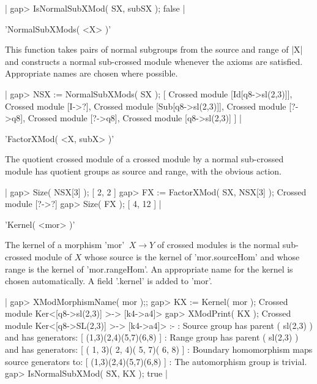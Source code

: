 |    gap> IsNormalSubXMod( SX, subSX );
    false  |

%

'NormalSubXMods( <X> )'

This function takes pairs of normal subgroups from the source and range of |X| 
and constructs a normal sub-crossed module whenever the axioms are satisfied.
Appropriate names are chosen where possible.

|    gap> NSX := NormalSubXMods( SX );
    [ Crossed module [Id[q8->sl(2,3)]], Crossed module [I->?], 
      Crossed module [Sub[q8->sl(2,3)]], Crossed module [?->q8], 
      Crossed module [?->q8], Crossed module [q8->sl(2,3)] ]    |

%

'FactorXMod( <X, subX> )'

The quotient crossed module of a crossed module by a normal sub-crossed
module has quotient groups as source and range, with the obvious action.

|    gap> Size( NSX[3] );
    [ 2, 2 ]
    gap> FX := FactorXMod( SX, NSX[3] );
    Crossed module [?->?]
    gap> Size( FX );
    [ 4, 12 ]  |

%

'Kernel( <mor> )'

The kernel of a morphism  'mor' $\: X \to Y$
of crossed modules is the normal sub-crossed module of $X$
whose source is the kernel of 'mor.sourceHom'
and whose range is the kernel of 'mor.rangeHom'.
An appropriate name for the kernel is chosen automatically.
A field '.kernel' is added to 'mor'.

|    gap> XModMorphismName( mor );;
    gap> KX := Kernel( mor );
    Crossed module Ker<[q8->sl(2,3)] >-> [k4->a4]>
    gap> XModPrint( KX );
    Crossed module Ker<[q8->SL(2,3)] >-> [k4->a4]> :- 
    : Source group has parent ( sl(2,3) )  and has generators:
      [ (1,3)(2,4)(5,7)(6,8) ]
    : Range group has parent ( sl(2,3) )  and has generators:
      [ ( 1, 3)( 2, 4)( 5, 7)( 6, 8) ]
    : Boundary homomorphism maps source generators to:
      [ (1,3)(2,4)(5,7)(6,8) ]
    : The automorphism group is trivial.
    gap> IsNormalSubXMod( SX, KX );
    true   |

